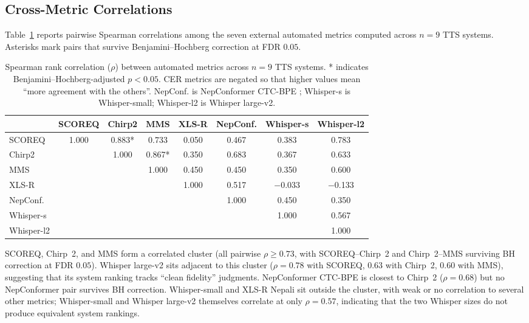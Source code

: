 \documentclass[11pt]{article}
\begin{document}
\subsection{Cross-Metric Correlations}

Table~\ref{tab:correlations} reports pairwise Spearman correlations among the seven external automated metrics computed across $n = 9$ TTS systems. Asterisks mark pairs that survive Benjamini--Hochberg correction at FDR $0.05$.

\begin{table}[t]
\centering
\caption{Spearman rank correlation ($\rho$) between automated metrics across $n = 9$ TTS systems. * indicates Benjamini--Hochberg-adjusted $p < 0.05$. CER metrics are negated so that higher values mean ``more agreement with the others''. NepConf. is NepConformer CTC-BPE \citep{poudel2026nepconformer}; Whisper-s is Whisper-small; Whisper-l2 is Whisper large-v2.}
\label{tab:correlations}
\footnotesize
\setlength{\tabcolsep}{3pt}
\begin{tabular}{lccccccc}
\toprule
 & SCOREQ & Chirp2 & MMS & XLS-R & NepConf. & Whisper-s & Whisper-l2 \\
\midrule
SCOREQ     & 1.000 & 0.883* & 0.733  & 0.050 & 0.467 & 0.383     & 0.783 \\
Chirp2     &       & 1.000  & 0.867* & 0.350 & 0.683 & 0.367     & 0.633 \\
MMS        &       &        & 1.000  & 0.450 & 0.450 & 0.350     & 0.600 \\
XLS-R      &       &        &        & 1.000 & 0.517 & $-$0.033  & $-$0.133 \\
NepConf.   &       &        &        &       & 1.000 & 0.450     & 0.350 \\
Whisper-s  &       &        &        &       &       & 1.000     & 0.567 \\
Whisper-l2 &       &        &        &       &       &           & 1.000 \\
\bottomrule
\end{tabular}
\end{table}

SCOREQ, Chirp~2, and MMS form a correlated cluster (all pairwise $\rho \geq 0.73$, with SCOREQ--Chirp~2 and Chirp~2--MMS surviving BH correction at FDR $0.05$). Whisper large-v2 sits adjacent to this cluster ($\rho = 0.78$ with SCOREQ, $0.63$ with Chirp~2, $0.60$ with MMS), suggesting that its system ranking tracks ``clean fidelity'' judgments. NepConformer CTC-BPE is closest to Chirp~2 ($\rho = 0.68$) but no NepConformer pair survives BH correction. Whisper-small and XLS-R Nepali sit outside the cluster, with weak or no correlation to several other metrics; Whisper-small and Whisper large-v2 themselves correlate at only $\rho = 0.57$, indicating that the two Whisper sizes do not produce equivalent system rankings.
\end{document}
